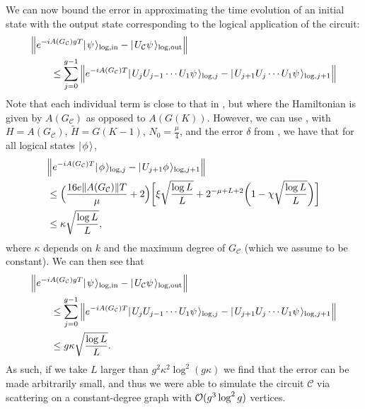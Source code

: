 \documentclass[../thesis-main/thesis-main]{subfiles}
\begin{document}
We can now bound the error in approximating the time evolution of an initial state with the output state corresponding to the logical application of the circuit:
\begin{align}
  &\Big \Vert e^{ -i A(G_{\mathcal{C}} )g T} |\mspace{2mu} \psi \mspace{2mu} \rangle_{\text{log},\text{in}} - |\mspace{2mu} U_{\mathcal{C}} \psi \mspace{2mu} \rangle_{\text{log},\text{out}}\Big \Vert\nonumber\\
  & \qquad \leq \sum_{j = 0}^{g-1} \Big \Vert e^{ -i A(G_{\mathcal{C}})T} |\mspace{2mu} U_{j} U_{j-1}\cdots U_1 \psi \mspace{2mu} \rangle_{\text{log},j} - |\mspace{2mu} U_{j+1}U_{j} \cdots U_1 \psi \mspace{2mu} \rangle_{\text{log},j+1}\Big \Vert
\end{align}
Note that each individual term is close to that in , but where the Hamiltonian is given by $A(G_{\mathcal{C}})$ as opposed to $A(G(K))$.  However, we can use , with $H = A(G_{\mathcal{C}})$, $\tilde{H} = G(K-1)$,  $N_0 = \frac{\mu}{4}$, and the error $\delta$ from , we have that for all logical states $|\mspace{2mu} \phi \mspace{2mu} \rangle$,
\begin{align}
   &\Big \Vert e^{ -i A(G_{\mathcal{C}})T} |\mspace{2mu} \phi \mspace{2mu} \rangle_{\text{log},j} - |\mspace{2mu} U_{j+1}\phi \mspace{2mu} \rangle_{\text{log},j+1}\Big \Vert\nonumber\\
   &\leq \Big(\frac{ 16 e \|{A(G_{\mathcal{C}})}\| T}{\mu} + 2\Big)\bigg[ \xi \sqrt{\frac{\log L}{L}} + 2^{- \mu + L +2} \bigg(1 -   \chi \sqrt{\frac{\log L}{L}} \bigg)\bigg]\\
   & \leq \kappa \sqrt{\frac{\log L}{L}},
\end{align}
where $\kappa$ depends on $k$ and the maximum degree of $G_{\mathcal{C}}$ (which we assume to be constant).  We can then see that
\begin{align}
  &\Big \Vert e^{- i A(G_{\mathcal{C}} )g T} |\mspace{2mu} \psi \mspace{2mu} \rangle_{\text{log},\text{in}} - |\mspace{2mu} U_{\mathcal{C}} \psi \mspace{2mu} \rangle_{\text{log},\text{out}}\Big \Vert\nonumber\\
  & \qquad \leq \sum_{j = 0}^{g-1} \Big \Vert e^{ -i A(G_{\mathcal{C}})T} |\mspace{2mu} U_{j} U_{j-1}\cdots U_1 \psi \mspace{2mu} \rangle_{\text{log},j} - |\mspace{2mu} U_{j+1}U_{j} \cdots U_1 \psi \mspace{2mu} \rangle_{\text{log},j+1}\Big \Vert\\
  &\qquad \leq g\kappa \sqrt{\frac{\log L}{L}}.
\end{align}
As such, if we take $L$ larger than $g^2\kappa^2\log^2(g\kappa)$ we find that the error can be made arbitrarily small, and thus we were able to simulate the circuit $\mathcal{C}$ via scattering on a constant-degree graph with $\mathcal{O}(g^3 \log^2 g)$ vertices.
\end{document}
